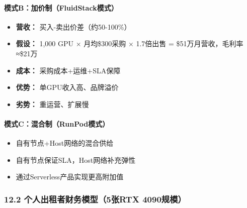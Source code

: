 \documentclass[UTF8,a4paper,12pt]{ctexart}
\begin{document}
\paragraph{模式B：加价制（FluidStack模式）}\label{ux6a21ux5f0fbux52a0ux4ef7ux5236fluidstackux6a21ux5f0f}

\begin{itemize}
\tightlist
\item
  \textbf{营收：} 买入-卖出价差（约50-100\%）
\item
  \textbf{假设：} 1,000 GPU × 月均\$300采购 × 1.7倍出售 =
  \$51万月营收，毛利率≈\$21万
\item
  \textbf{成本：} 采购成本+运维+SLA保障
\item
  \textbf{优势：} 单GPU收入高、品牌溢价
\item
  \textbf{劣势：} 重运营、扩展慢
\end{itemize}

\paragraph{模式C：混合制（RunPod模式）}\label{ux6a21ux5f0fcux6df7ux5408ux5236runpodux6a21ux5f0f}

\begin{itemize}
\tightlist
\item
  自有节点+Host网络的混合供给
\item
  自有节点保证SLA，Host网络补充弹性
\item
  通过Serverless产品实现更高附加值
\end{itemize}

\subsubsection{12.2 个人出租者财务模型（5张RTX
4090规模）}\label{ux4e2aux4ebaux51faux79dfux8005ux8d22ux52a1ux6a21ux578b5ux5f20rtx-4090ux89c4ux6a21}
\end{document}
